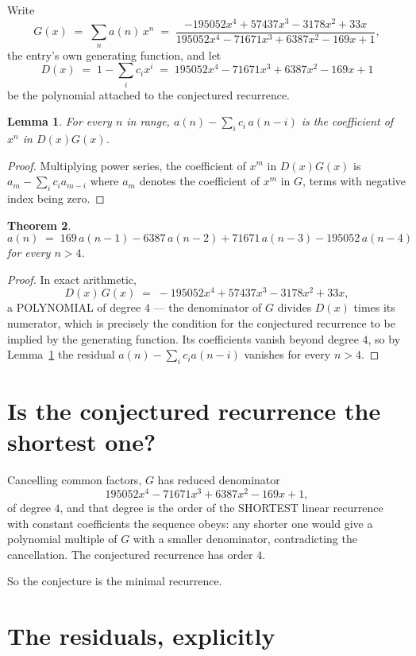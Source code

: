 \documentclass[11pt,a4paper]{article}
\theoremstyle{plain}
\newtheorem{theorem}{Theorem}
\newtheorem{lemma}[theorem]{Lemma}
\theoremstyle{definition}
\begin{document}
Write
\[
G(x)\;=\;\sum_{n}a(n)\,x^{n}\;=\;\frac{- 195052 x^{4} + 57437 x^{3} - 3178 x^{2} + 33 x}{195052 x^{4} - 71671 x^{3} + 6387 x^{2} - 169 x + 1},
\]
the entry's own generating function, and let
\[
D(x)\;=\;1-\sum_i c_i x^{i}\;=\;195052 x^{4} - 71671 x^{3} + 6387 x^{2} - 169 x + 1
\]
be the polynomial attached to the conjectured recurrence.

\begin{lemma}\label{lem:key}
For every $n$ in range, $a(n)-\sum_i c_i\,a(n-i)$ is the coefficient of $x^{n}$ in
$D(x)G(x)$.
\end{lemma}

\begin{proof}
Multiplying power series, the coefficient of $x^{m}$ in $D(x)G(x)$ is
$a_m-\sum_i c_i a_{m-i}$ where $a_m$ denotes the coefficient of $x^{m}$ in $G$, terms with
negative index being zero.
\end{proof}

\begin{theorem}
\[
a(n)\;=\;169\,a(n-1) - 6387\,a(n-2) + 71671\,a(n-3) - 195052\,a(n-4)
\]
for every $n>4$.
\end{theorem}

\begin{proof}
In exact arithmetic,
\[
D(x)\,G(x)\;=\;- 195052 x^{4} + 57437 x^{3} - 3178 x^{2} + 33 x,
\]
a POLYNOMIAL of degree $4$ --- the denominator of $G$ divides $D(x)$ times its numerator,
which is precisely the condition for the conjectured recurrence to be implied by the
generating function. Its coefficients vanish beyond degree $4$, so by
Lemma~\ref{lem:key} the residual $a(n)-\sum_ic_ia(n-i)$ vanishes for every
$n>4$.
\end{proof}

\section{Is the conjectured recurrence the shortest one?}

Cancelling common factors, $G$ has reduced denominator
\[
195052 x^{4} - 71671 x^{3} + 6387 x^{2} - 169 x + 1,
\]
of degree $4$, and that degree is the order of the SHORTEST linear recurrence with
constant coefficients the sequence obeys: any shorter one would give a polynomial multiple of
$G$ with a smaller denominator, contradicting the cancellation. The conjectured recurrence has
order $4$.

So the conjecture is the minimal recurrence.

\section{The residuals, explicitly}
\end{document}
